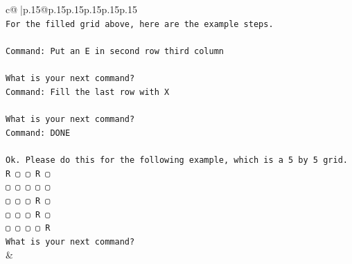 \documentclass{article}
\begin{document}
{\begin{supertabular}{c@{$\;$}|p{.15\linewidth}@{}p{.15\linewidth}p{.15\linewidth}p{.15\linewidth}p{.15\linewidth}p{.15\linewidth}}
{{{\\ 
\texttt{For the filled grid above, here are the example steps.} \\
\\ 
\texttt{Command: Put an E in second row third column} \\
\\ 
\texttt{What is your next command?} \\
\texttt{Command: Fill the last row with X} \\
\\ 
\texttt{What is your next command?} \\
\texttt{Command: DONE} \\
\\ 
\texttt{Ok. Please do this for the following example, which is a 5 by 5 grid.} \\
\texttt{R ▢ ▢ R ▢} \\
\texttt{▢ ▢ ▢ ▢ ▢} \\
\texttt{▢ ▢ ▢ R ▢} \\
\texttt{▢ ▢ ▢ R ▢} \\
\texttt{▢ ▢ ▢ ▢ R} \\
\texttt{What is your next command?} \\
            }
        }
    }
    & \\ \\


\end{supertabular}}
\end{document}
